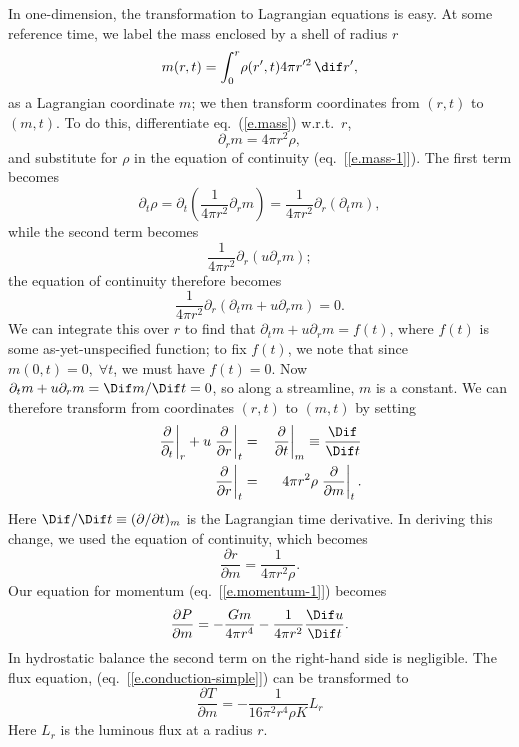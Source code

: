 In one-dimension, the transformation to Lagrangian equations is easy.  At some reference time, we label the mass enclosed by a shell of radius $r$
\begin{equation}\label{e.mass}
	m(r,t) = \int_{0}^{r}\! \rho(r',t) 4\pi r'^{2} \,\dif r',
\end{equation}
as a Lagrangian coordinate $m$; we then transform coordinates from $(r,t)$ to $(m,t)$.
To do this, differentiate eq.~(\ref{e.mass}) w.r.t.\ $r$,
\[ \partial_{r}m = 4\pi r^{2}\rho, \]
and substitute for $\rho$ in the equation of  continuity (eq.~[\ref{e.mass-1}]).  The first term becomes
\[
	\partial_{t}\rho = \partial_{t}\left(\frac{1}{4\pi r^{2}} \partial_{r} m\right)
	= \frac{1}{4\pi r^{2}}\partial_{r}(\partial_{t}m),
\]
while the second term becomes
\[
	\frac{1}{4\pi r^{2}}\partial_{r}\left(u\partial_{r}m\right);
\]
the equation of continuity therefore becomes
\begin{equation}\label{e.mod-continuity}
	\frac{1}{4\pi r^{2}} \partial_{r}\left( \partial_{t} m + u\partial_{r} m\right) = 0.
\end{equation}
We can integrate this over $r$ to find that $\partial_{t} m + u\partial_{r} m = f(t)$, where $f(t)$ is some as-yet-unspecified function; to fix $f(t)$, we note that since $m(0,t) = 0,\;\forall t$, we must have $f(t) = 0$.  Now $\partial_{t} m + u\partial_{r} m = \Dif m/\Dif t = 0$, so along a streamline, $m$ is a constant.  We can therefore transform from coordinates $(r,t)$ to $(m,t)$ by setting
\begin{eqnarray}
	\label{e.lagrange-rule-1}
	\left.\frac{\partial}{\partial_{t}}\right|_{r} + u\left.\frac{\partial}{\partial r}\right|_{t}
	&=& \left.\frac{\partial}{\partial t}\right|_{m} \equiv \frac{\Dif}{\Dif t}\\
	\label{e.lagrange-rule-2}
	\left.\frac{\partial}{\partial r}\right|_{t} &=& 4\pi r^{2}\rho \left.\frac{\partial}{\partial m}\right|_{t}.
\end{eqnarray}
Here $\Dif/\Dif t \equiv (\partial/\partial t)_{m}$ is the Lagrangian time derivative.  In deriving this change, we used the equation of continuity, which becomes
\begin{equation}\label{e.lagrange-r}
\frac{\partial r}{\partial m} = \frac{1}{4\pi r^{2}\rho}.
\end{equation}
Our equation for momentum (eq.~[\ref{e.momentum-1}]) becomes
\begin{equation}\label{e.lagrange-momentum}
\frac{\partial P}{\partial m} = -\frac{Gm}{4\pi r^{4}} - \frac{1}{4\pi r^{2}}\frac{\Dif u}{\Dif t}.
\end{equation}
In hydrostatic balance the second term on the right-hand side is negligible.
The flux equation, (eq.~[\ref{e.conduction-simple}]) can be transformed to
\begin{equation}\label{e.lagrange-flux}
\frac{\partial T}{\partial m} = - \frac{1}{16\pi^{2} r^{4}\rho K}L_{r}
\end{equation}
Here $L_{r}$ is the luminous flux at a radius $r$.

